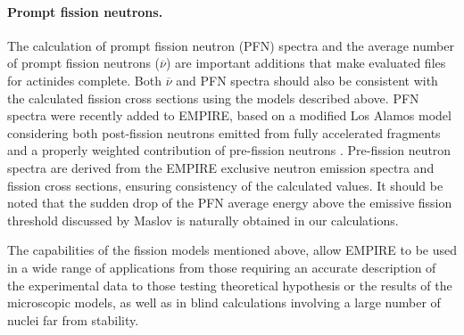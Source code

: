 %
%
%

\paragraph{Prompt fission neutrons.}

The calculation of prompt fission neutron (PFN) spectra and the
average number of prompt fission
neutrons ($\overline{\nu}$) are important additions that make
evaluated files for actinides complete. Both $\overline{\nu}$ and PFN
spectra should also be consistent with the calculated fission cross sections using
the models described above. PFN spectra were recently added
to EMPIRE, based on a modified Los Alamos model considering both
post-fission neutrons emitted from fully accelerated fragments and a
properly weighted contribution of pre-fission neutrons \cite{ma03}.
Pre-fission neutron spectra are derived from the EMPIRE exclusive
neutron emission spectra and fission cross sections, ensuring consistency of
the calculated values. It should be noted that the sudden drop of the PFN
average energy above the emissive fission threshold discussed by Maslov \cite%
{ma03} is naturally obtained in our calculations.

\bigskip

The capabilities of the fission models mentioned above, allow EMPIRE to be
used in a wide range of applications from those requiring an accurate
description of the experimental data to those testing theoretical
hypothesis or the results of the microscopic models, as well as in
blind calculations involving a large number of nuclei far from stability.

